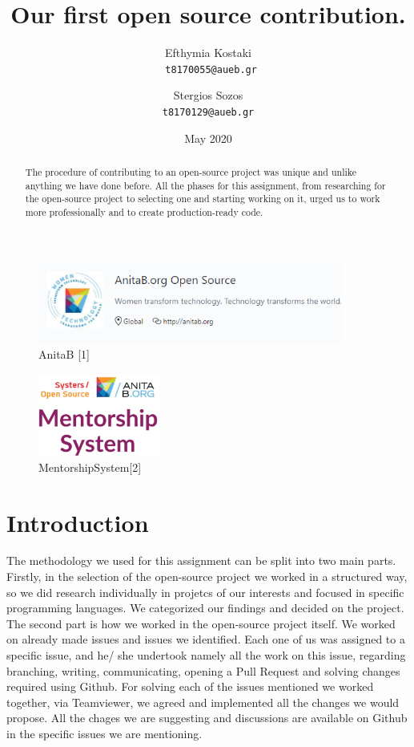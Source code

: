 \documentclass{article}
\title{Our first open source contribution.}
\author{Efthymia Kostaki \\
	 \texttt{ t8170055@aueb.gr}
	 \and
	 Stergios Sozos \\
 	 \texttt{t8170129@aueb.gr}
}
\date{May 2020}
\begin{document}
\maketitle

\begin{abstract}
The procedure of contributing to an open-source project was unique and unlike anything we have done before. All the phases for this assignment, from researching for the open-source project to selecting one and starting working on it, urged us to 
work more professionally and to create production-ready code.
\end{abstract}

\begin{figure}[tph!]
\centerline{\includegraphics[totalheight=3cm, width= 10cm]{anitab-logo.png}}
    \caption{AnitaB [1]}
    \label{fig:verticalcell}
\end{figure}

\begin{figure}[tph!]
\centerline{\includegraphics[totalheight=4cm, width= 4cm]{mentorship-system-logo.png}}
    \caption{MentorshipSystem[2]}
    \label{fig:verticalcell}
\end{figure}
\newpage

\tableofcontents

\newpage

\section*{Introduction}
The methodology we used for this assignment can be split into two main parts. Firstly, in the selection of the open-source project we worked in a structured way, so we did research individually in projetcs of our interests and focused in specific programming languages. We categorized our findings and decided on the project. The second part is how we worked in the open-source project itself. We worked on already made issues and issues we identified.  Each one of us was assigned to a specific issue, and he/ she undertook namely all the work on this issue, regarding branching, writing, communicating, opening a Pull Request and solving changes required using Github. For solving each of the issues mentioned we worked together, via Teamviewer, we agreed and implemented  all the changes we would propose. All the chages we are suggesting and discussions are available on Github in the specific issues we are mentioning.
\end{document}
